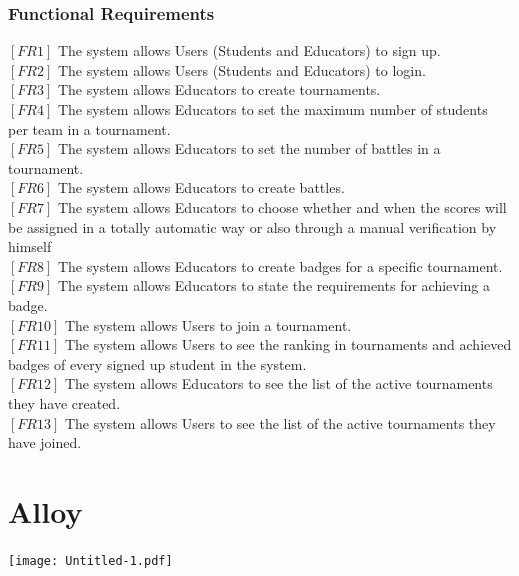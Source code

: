 \documentclass{article}
\begin{document}
\subsubsection{Functional Requirements}
$[FR1]$ The system allows Users (Students and Educators) to sign up.\\
$[FR2]$ The system allows Users (Students and Educators) to login.\\
$[FR3]$ The system allows Educators to create tournaments.\\
$[FR4]$ The system allows Educators to set the maximum number of students per team in a tournament.\\
$[FR5]$ The system allows Educators to set the number of battles in a tournament.\\
$[FR6]$ The system allows Educators to create battles.\\
$[FR7]$ The system allows Educators to choose whether and when the scores will be assigned in a totally automatic way or also through a manual verification by himself\\
$[FR8]$ The system allows Educators to create badges for a specific tournament.\\
$[FR9]$ The system allows Educators to state the requirements for achieving a badge.\\
$[FR10]$ The system allows Users to join a tournament.\\
$[FR11]$ The system allows Users to see the ranking in tournaments and achieved badges of every signed up student in the system.\\
$[FR12]$ The system allows Educators to see the list of the active tournaments they have created.\\
$[FR13]$ The system allows Users to see the list of the active tournaments they have joined.\\

\newpage

\section{Alloy}
\texttt{[image: Untitled-1.pdf]}
\end{document}
